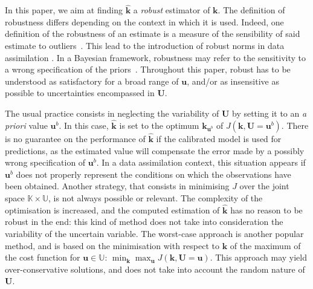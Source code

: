 \documentclass[preprint, 1p]{elsarticle}
\newcommand{\kest}{\hat{\mathbf{k}}}
\newcommand{\Kspace}{\mathbb{K}}
\newcommand{\Uspace}{\mathbb{U}}
\begin{document}
In this paper, we aim at finding $\kest$ a {\it robust\/} estimator of $\mathbf{k}$.
The definition of robustness differs depending on the context in which it is used. Indeed, one definition of the robustness of an estimate is a measure of the sensibility of said estimate to outliers~\citep{huber_robust_2011}. This lead to the introduction of robust norms in data assimilation \citep{rao_robust_2015}. %
In a Bayesian framework, robustness may refer to the sensitivity to a wrong specification of the priors~\citep{berger_overview_1994}.
%
Throughout this paper, 
robust has to be understood as satisfactory for a broad range of $\mathbf{u}$, and/or as insensitive as possible to uncertainties encompassed in $\mathbf{U}$.

The usual practice consists in neglecting the variability of $\mathbf{U}$ by setting it to an {\it a priori} value $\mathbf{u}^b$.
 In this case, $\kest$ is set to the optimum ${\mathbf{k}}_{\mathbf{u}^{b}} $ of $J(\mathbf{k}, \mathbf{U}=\mathbf{u}^b)$.  There is no guarantee on the performance of $\kest$ if the calibrated model is used for predictions, as the estimated value will compensate the error made by a possibly wrong specification of $\mathbf{u}^b$.
In a data assimilation context, this situation appears if $\mathbf{u}^b$ does not properly represent the conditions on which the observations have been obtained.
Another strategy, that consists in minimising $J$ over the joint space $\Kspace\times\Uspace$, is not always possible or relevant. The complexity of the optimisation is increased, and the computed estimation of $\kest$ has no reason to be robust in the end: this kind of method does not take into consideration the variability of the uncertain variable. 
%
The worst-case approach \citep{marzat_worst-case_2013} is another popular method, and is based on the minimisation with respect to $\mathbf{k}$ of the maximum of the cost function for $\mathbf{u}\in\Uspace$: $\min_{\mathbf{k}} \max_{\mathbf{u}} J(\mathbf{k}, \mathbf{U} = \mathbf{u})$. This approach may yield over-conservative solutions, and does not take into account the random nature of $\mathbf{U}$.%
\end{document}
